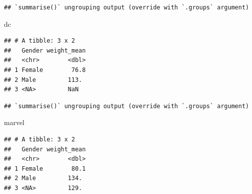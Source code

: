 \documentclass[]{book}
\newenvironment{Shaded}{\begin{snugshade}}{\end{snugshade}}
\newcommand{\KeywordTok}[1]{\textcolor[rgb]{0.13,0.29,0.53}{\textbf{#1}}}
\newcommand{\DataTypeTok}[1]{\textcolor[rgb]{0.13,0.29,0.53}{#1}}
\newcommand{\StringTok}[1]{\textcolor[rgb]{0.31,0.60,0.02}{#1}}
\newcommand{\OtherTok}[1]{\textcolor[rgb]{0.56,0.35,0.01}{#1}}
\newcommand{\OperatorTok}[1]{\textcolor[rgb]{0.81,0.36,0.00}{\textbf{#1}}}
\newcommand{\NormalTok}[1]{#1}
\begin{document}
\begin{verbatim}
## `summarise()` ungrouping output (override with `.groups` argument)
\end{verbatim}

\begin{Shaded}
\begin{Highlighting}[]
\NormalTok{dc}
\end{Highlighting}
\end{Shaded}

\begin{verbatim}
## # A tibble: 3 x 2
##   Gender weight_mean
##   <chr>        <dbl>
## 1 Female        76.8
## 2 Male         113. 
## 3 <NA>         NaN
\end{verbatim}

\begin{Shaded}
\end{Shaded}

\begin{verbatim}
## `summarise()` ungrouping output (override with `.groups` argument)
\end{verbatim}

\begin{Shaded}
\begin{Highlighting}[]
\NormalTok{marvel}
\end{Highlighting}
\end{Shaded}

\begin{verbatim}
## # A tibble: 3 x 2
##   Gender weight_mean
##   <chr>        <dbl>
## 1 Female        80.1
## 2 Male         134. 
## 3 <NA>         129.
\end{verbatim}

\begin{Shaded}
\end{Shaded}
\end{document}
